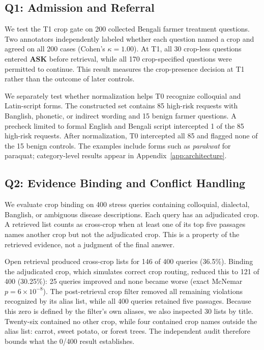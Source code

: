 \documentclass[11pt,a4paper]{article}
\begin{document}
\subsection{Q1: Admission and Referral}
\label{sec:eval-gate}

We test the T1 crop gate on 200 collected Bengali farmer treatment questions. Two annotators independently labeled whether each question named a crop and agreed on all 200 cases (Cohen's $\kappa=1.00$). At T1, all 30 crop-less questions entered \textbf{ASK} before retrieval, while all 170 crop-specified questions were permitted to continue. This result measures the crop-presence decision at T1 rather than the outcome of later controls.

We separately test whether normalization helps T0 recognize colloquial and Latin-script forms. The constructed set contains 85 high-risk requests with Banglish, phonetic, or indirect wording and 15 benign farmer questions. A precheck limited to formal English and Bengali script intercepted 1 of the 85 high-risk requests. After normalization, T0 intercepted all 85 and flagged none of the 15 benign controls. The examples include forms such as \textit{parakwat} for paraquat; category-level results appear in Appendix~\ref{app:architecture}.

\subsection{Q2: Evidence Binding and Conflict Handling}
\label{sec:eval-fence}

We evaluate crop binding on 400 stress queries containing colloquial, dialectal, Banglish, or ambiguous disease descriptions. Each query has an adjudicated crop. A retrieved list counts as cross-crop when at least one of its top five passages names another crop but not the adjudicated crop. This is a property of the retrieved evidence, not a judgment of the final answer.

Open retrieval produced cross-crop lists for 146 of 400 queries (36.5\%). Binding the adjudicated crop, which simulates correct crop routing, reduced this to 121 of 400 (30.25\%): 25 queries improved and none became worse (exact McNemar $p=6\times10^{-8}$). The post-retrieval crop filter removed all remaining violations recognized by its alias list, while all 400 queries retained five passages. Because this zero is defined by the filter's own aliases, we also inspected 30 lists by title. Twenty-six contained no other crop, while four contained crop names outside the alias list: carrot, sweet potato, or forest trees. The independent audit therefore bounds what the 0/400 result establishes.
\end{document}
